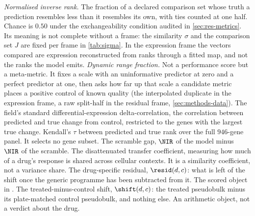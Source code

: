 \begin{description}[labelwidth=5em, leftmargin=6em, labelsep=0.6em,
                    style=multiline, font=\normalfont, itemsep=0.5ex]
 \emph{Normalised inverse rank.} The fraction of a declared
  comparison set whose truth a prediction resembles less than it resembles its
  own, with ties counted at one half. Chance is $0.50$ under the exchangeability
  condition audited in \cref{sec:res-metrics}. Its meaning is not complete
  without a frame: the similarity $\sigma$ and the comparison set $J$ are fixed
  per frame in \cref{tab:sigma}. In the expression frame the vectors compared
  are expression reconstructed from ranks through a fitted map, and not the
  ranks the model emits.
 \emph{Dynamic range fraction.} Not a performance score but
  a meta-metric. It fixes a scale with an uninformative predictor at zero and a
  perfect predictor at one, then asks how far up that scale a candidate metric
  places a positive control of known quality (the interpolated duplicate in the
  expression frame, a raw split-half in the residual frame,
  \cref{sec:methods-data}).
 The field's standard differential-expres\-sion
  delta-cor\-re\-la\-tion, the correlation between predicted and true change
  from control, restricted to the genes with the largest true change.
 Kendall's $\tau$ between predicted and true rank
  over the full $946$-gene panel. It selects no gene subset.
 The scramble gap, $\NIR$ of the model minus $\NIR$ of the
  scramble.
 The disattenuated transfer coefficient, measuring how
  much of a drug's response is shared across cellular contexts. It is a
  similarity coefficient, not a variance share.
 The drug-specific residual, $\resid(d,c)$: what is
  left of the shift once the generic programme has been subtracted from it. The
  scored object in \Rframe.
 The treated-minus-control shift, $\shift(d,c)$: the
  treated pseudobulk minus its plate-matched control pseudobulk, and nothing
  else. An arithmetic object, not a verdict about the drug.

\end{description}
